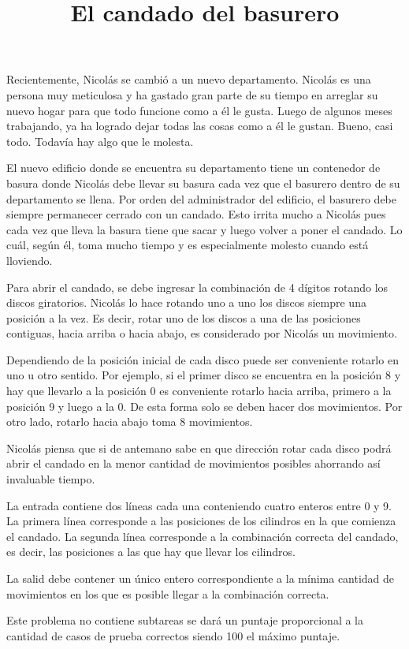 \documentclass{oci}
\title{El candado del basurero}
\begin{document}
\begin{problemDescription}
  Recientemente, Nicolás se cambió a un nuevo departamento.
  Nicolás es una persona muy meticulosa y ha gastado gran parte de su tiempo en arreglar su
  nuevo hogar para que todo funcione como a él le gusta.
  Luego de algunos meses trabajando, ya ha logrado dejar todas las cosas como a él le gustan.
  Bueno, casi todo.
  Todavía hay algo que le molesta.

  El nuevo edificio donde se encuentra su departamento tiene un contenedor de basura donde Nicolás
  debe llevar su basura cada vez que el basurero dentro de su departamento se llena.
  Por orden del administrador del edificio, el basurero debe siempre permanecer cerrado con un
  candado.
  Esto irrita mucho a Nicolás pues cada vez que lleva la basura tiene que sacar y luego volver a
  poner el candado.
  Lo cuál, según él, toma mucho tiempo y es especialmente molesto cuando está lloviendo.

  Para abrir el candado, se debe ingresar la combinación de 4 dígitos rotando los discos
  giratorios.
  Nicolás lo hace rotando uno a uno los discos siempre una posición a la vez.
  Es decir, rotar uno de los discos a una de las posiciones contiguas, hacia arriba o hacia abajo, es
  considerado por Nicolás un movimiento.

  Dependiendo de la posición inicial de cada disco puede ser conveniente rotarlo en uno u otro
  sentido.
  Por ejemplo, si el primer disco se encuentra en la posición 8 y hay que llevarlo a la posición 0 es
  conveniente rotarlo hacia arriba, primero a la posición 9 y luego a la 0.
  De esta forma solo se deben hacer dos movimientos.
  Por otro lado, rotarlo hacia abajo toma 8 movimientos.

  Nicolás piensa que si de antemano sabe en que dirección rotar cada disco podrá abrir el candado en
  la menor cantidad de movimientos posibles ahorrando así invaluable tiempo.
\end{problemDescription}

\begin{inputDescription}
  La entrada contiene dos líneas cada una conteniendo cuatro enteros entre 0 y 9.
  La primera línea corresponde a las posiciones de los cilindros en la que comienza el candado.
  La segunda línea corresponde a la combinación correcta del candado, es decir, las posiciones a las
  que hay que llevar los cilindros.
\end{inputDescription}

\begin{outputDescription}
  La salid debe contener un único entero correspondiente a la mínima cantidad de movimientos en los
  que es posible llegar a la combinación correcta.
\end{outputDescription}

\begin{scoreDescription}
  Este problema no contiene subtareas se dará un puntaje proporcional a la cantidad de casos de
  prueba correctos siendo 100 el máximo puntaje.
\end{scoreDescription}

\begin{sampleDescription}
\end{sampleDescription}
\end{document}
